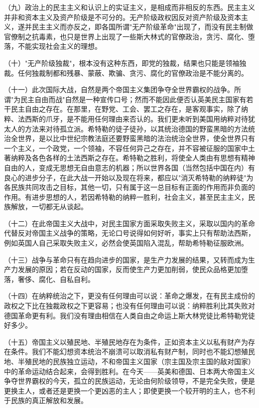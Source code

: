 \documentclass[
  openany,           %
  12pt,              %
  a4paper            %
]{ctexbook}
\begin{document}
（九）政治上的民主主义和认识上的实证主义，是相成而非相反的东西。民主主义并非和资本主义及资产阶级是不可分的。无产阶级政权因反对资产阶级及资本主义，遂并民主主义而亦反之，即各国所谓"无产阶级革命"出现了，而没有民主制做官僚制之抗毒素，也只是世界上出现了一些斯大林式的官僚政治，贪污、腐化、堕落，不能实现社会主义的理想。

（十）"无产阶级独裁"，根本没有这种东西，即党的独裁，结果也只能是领袖独裁。任何独裁制都和残暴、蒙蔽、欺骗、贪污、腐化的官僚政治是不能分离的。

（十一）此次国际大战，自然是两个帝国主义集团争夺全世界霸权的战争。所谓"为民主自由而战"自然是一种宣传口号；然而不能因此便否认英美民主国家有若干民主自由之存在。在那里，在野党、工会、罢工之存在，是客观事实，除了纳粹、法西斯的爪牙，是不能用任何理由来否认的。我们更未听到美国用纳粹对待犹太人的方法来对待孤立派。希特勒的徒子徒孙，以其统治德国的野蛮黑暗的方法统治全世界，是以比中世纪宗教法庭还要野蛮黑暗的法治统治全世界，使全世界只有一个主义，一个政党，一个领袖，不容任何异己之存在，并不容被征服的国家中土著纳粹及各色各样的土法西斯之存在。希特勒之胜利，将使全人类由有思想有精神自由的人，变成无思想无自由意志的机器；所以世界各国（当然包括中国在内）有良心的进步分子，在此大战一开始以及现在将来，都应以"消灭希特勒的纳粹徒"为各民族共同攻击之目标，其他一切，只有属于这一总目标有正面的作用而非负面的作用。有进步思想的人，若因希特勒的纳粹一胜利，社会主义，甚至民主主义，民族解放，一切都无从谈起。

（十二）在此帝国主义大战中，对民主国家方面采取失败主义，采取以国内的革命代替反对帝国主义战争的策略，无论口号说得如何好听，事实上只有帮助法西斯，例如英国人自己采取失败主义，必然会使英国陷入混乱，帮助希特勒征服欧洲。

（十三）战争与革命只有在趋向进步的国家，是生产力发展的结果，又转而成为生产力发展的原因；若在反动的国家，反而使生产力更加削弱，使民众品格更加堕落，奢侈、腐化、自私自利。

（十四）在纳粹统治之下，更没有任何理由可以说：革命之爆发，在有民主成份的政权之下比在独裁政权之下更容易；也没有任何理由可以说：纳粹胜利比其失败对德国革命更有利。我们没有理由相信在人类自由之命运上斯大林党徒比希特勒党徒好多少。

（十五）帝国主义以殖民地、半殖民地存在为条件，正如资本主义以私有财产为存在条件。我们不能幻想资本统治不崩溃可以取消私有财产制，同时也不能幻想殖民地、半殖民地的民族独立运动，不和帝国主义国家（宗主国及宗主国的敌对国家）中的革命运动结合起来，会得到胜利。在今天——英美和德国、日本两大帝国主义争夺世界霸权的今天，孤立的民族运动，无论由何阶级领导，不是完全失败，便是更换主人，或者还是更换一个更凶恶的主人；即使更换一个较开明的主人，也不利于民族的真正解放和发展。
\end{document}
